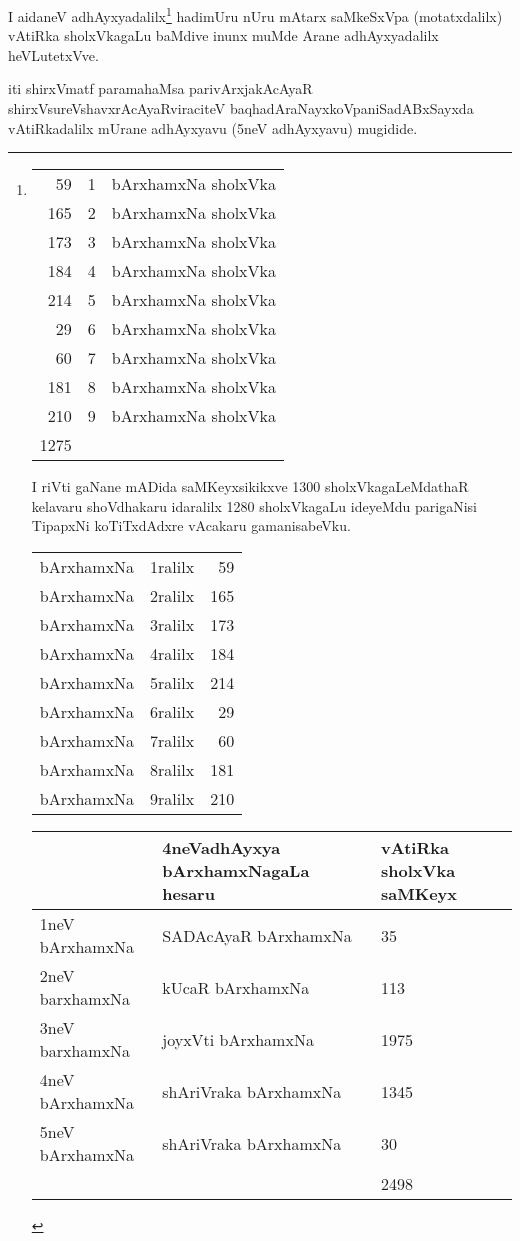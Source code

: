 \begin{artha}
I aidaneV adhAyxyadalilx\footnote{
\begin{tabular}{rll}
59 &1 & bArxhamxNa sholxVka\\
165 & 2 & bArxhamxNa sholxVka\\
173 & 3 & bArxhamxNa sholxVka\\
184 & 4 & bArxhamxNa sholxVka\\
214 & 5 & bArxhamxNa sholxVka\\
29 & 6 & bArxhamxNa sholxVka\\
60 & 7 & bArxhamxNa sholxVka\\
181 & 8 & bArxhamxNa sholxVka\\
210 & 9 & bArxhamxNa sholxVka\\
\hline
1275
\end{tabular}

I riVti gaNane mADida saMKeyxsikikxve
1300 sholxVkagaLeMdathaR kelavaru shoVdhakaru idaralilx 1280 sholxVkagaLu ideyeMdu parigaNisi TipapxNi koTiTxdAdxre vAcakaru gamanisabeVku.

\begin{tabular}{lrr}
bArxhamxNa & 1ralilx & 59\\
bArxhamxNa & 2ralilx & 165\\
bArxhamxNa & 3ralilx & 173\\
bArxhamxNa & 4ralilx & 184\\
bArxhamxNa & 5ralilx & 214\\
bArxhamxNa & 6ralilx & 29\\
bArxhamxNa & 7ralilx & 60\\
bArxhamxNa & 8ralilx & 181\\
bArxhamxNa & 9ralilx & 210
\end{tabular}


\begin{tabular}{|l|l|l|}
\hline
& 4neVadhAyxya bArxhamxNagaLa hesaru & vAtiRka sholxVka saMKeyx\\
\hline
1neV bArxhamxNa & SADAcAyaR bArxhamxNa & 35\\
2neV barxhamxNa & kUcaR bArxhamxNa & 113\\
3neV barxhamxNa & joyxVti bArxhamxNa & 1975\\
4neV bArxhamxNa & shAriVraka bArxhamxNa & 1345\\
5neV bArxhamxNa & shAriVraka bArxhamxNa & 30\\
\hline
& &  2498\\
\hline
\end{tabular}
} hadimUru nUru mAtarx saMkeSxVpa (motatxdalilx) vAtiRka sholxVkagaLu baMdive inunx muMde Arane adhAyxyadalilx heVLutetxVve.
\end{artha}

\begin{center}
iti shirxVmatf paramahaMsa parivArxjakAcAyaR shirxVsureVshavxrAcAyaRviraciteV baqhadAraNayxkoVpaniSadABxSayxda vAtiRkadalilx mUrane adhAyxyavu  (5neV adhAyxyavu) mugidide.
\end{center}

